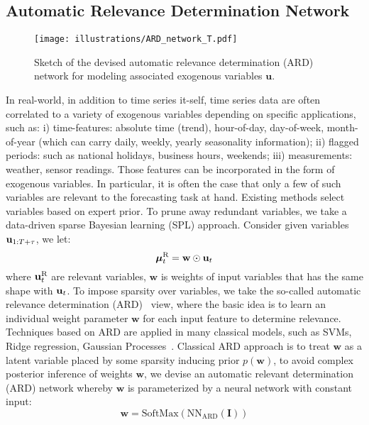 \documentclass{article}
\begin{document}
\subsection{Automatic Relevance Determination Network}
\begin{figure}[!tb]
    \centering
    \texttt{[image: illustrations/ARD\_network\_T.pdf]}
    \caption{Sketch of the devised automatic relevance determination (ARD) network for modeling associated exogenous variables $\mathbf{u}$.}
    \label{fig:ARD}
\end{figure}

In real-world, in addition to time series it-self, time series data are often correlated to a variety of exogenous variables depending on specific applications, such as: i) time-features: absolute time (trend), hour-of-day, day-of-week, month-of-year (which can carry daily, weekly, yearly seasonality information); ii) flagged periods: such as national holidays, business hours, weekends; iii) measurements: weather, sensor readings. Those features can be incorporated in the form of exogenous variables. In particular, it is often the case that only a few of such variables are relevant to the forecasting task at hand. Existing methods \cite{wen2017multi,rangapuram2018deep,flunkert2017deepar}
select variables based on expert prior. To prune away redundant variables, we take a data-driven sparse Bayesian learning (SPL) approach. Consider given variables $\mathbf{u}_{1:T+\tau}$, we let:
\begin{equation}
    \bm{\mu}_{t}^{\text{R}} = \mathbf{w} \odot \mathbf{u}_t
\end{equation}
where $\mathbf{u}_t^{\text{R}}$ are relevant variables, $\mathbf{w}$ is weights of input variables that has the same shape with $\mathbf{u}_t$. To impose sparsity over variables, we take the so-called automatic relevance determination (ARD)~\cite{neal2012bayesian} view, where the basic idea is to learn an individual weight parameter $\mathbf{w}$ for each input feature to determine relevance. Techniques based on ARD are applied in many classical models, such as SVMs, Ridge regression, Gaussian Processes~\cite{bishop2000variational}. Classical ARD approach is to treat $\mathbf{w}$ as a latent variable placed by some sparsity inducing prior $p(\mathbf{w})$, to avoid complex posterior inference of weights $\mathbf{w}$, we devise an automatic relevant determination (ARD) network whereby $\mathbf{w}$ is parameterized by a neural network with constant input:
\begin{equation}\label{eq:relevance_w}
    \mathbf{w} = \text{SoftMax}(\text{NN}_{\text{ARD}}(\mathbf{I}))
\end{equation}
\end{document}

